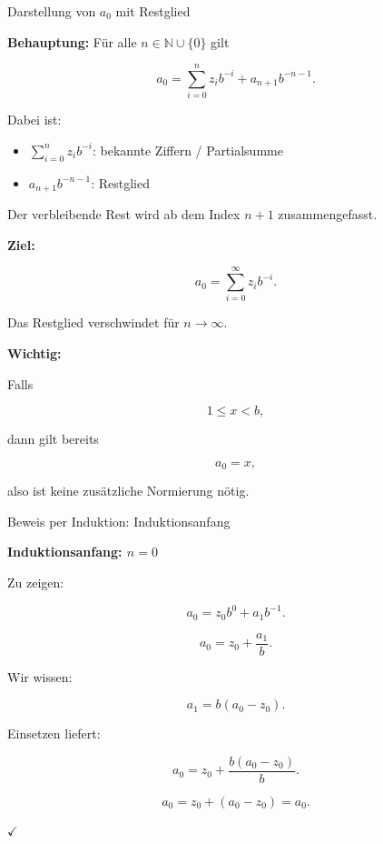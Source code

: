 \documentclass{beamer}
\newcommand{\N}{\mathbb{N}}
\begin{document}
\begin{frame}{Darstellung von \(a_0\) mit Restglied}

\scriptsize

\textbf{Behauptung:} Für alle \(n\in\N\cup\{0\}\) gilt

\[
a_0=
\sum_{i=0}^{n} z_i b^{-i}
+
a_{n+1}b^{-n-1}.
\]

\vspace{0.2cm}

Dabei ist:

\begin{itemize}
\item \(\sum_{i=0}^{n} z_i b^{-i}\): bekannte Ziffern / Partialsumme
\item \(a_{n+1}b^{-n-1}\): Restglied
\end{itemize}

\vspace{0.2cm}

Der verbleibende Rest wird ab dem Index \(n+1\) zusammengefasst.

\vspace{0.3cm}

\textbf{Ziel:}

\[
a_0=\sum_{i=0}^{\infty} z_i b^{-i}.
\]

Das Restglied verschwindet für \(n\to\infty\).

\vspace{0.3cm}

\textbf{Wichtig:}

Falls

\[
1\leq x<b,
\]

dann gilt bereits

\[
a_0=x,
\]

also ist keine zusätzliche Normierung nötig.

\end{frame}

\begin{frame}{Beweis per Induktion: Induktionsanfang}

\small

\textbf{Induktionsanfang: \(n=0\)}

Zu zeigen:

\[
a_0=z_0 b^{0}+a_1 b^{-1}.
\]

\[
a_0=z_0+\frac{a_1}{b}.
\]

Wir wissen:

\[
a_1=b(a_0-z_0).
\]

Einsetzen liefert:

\[
a_0=
z_0+\frac{b(a_0-z_0)}{b}.
\]

\[
a_0=
z_0+(a_0-z_0)=a_0.
\]

\hfill \(\checkmark\)

\end{frame}
\end{document}
